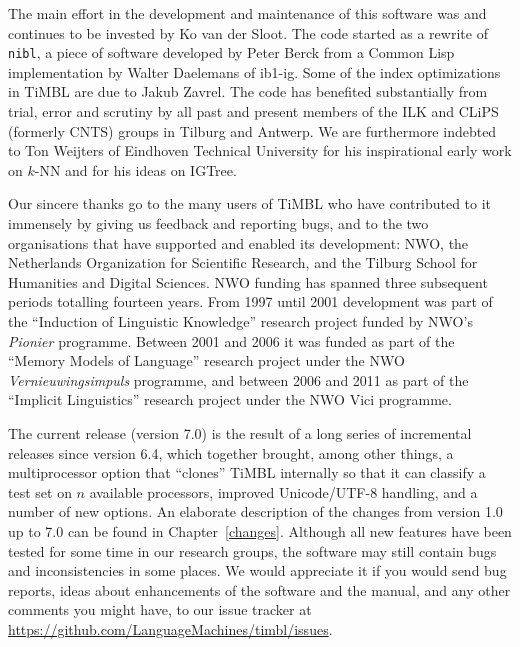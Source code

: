 \documentclass{book}
\begin{document}
The main effort in the development and maintenance of this software
was and continues to be invested by Ko van der Sloot. The code started
as a rewrite of {\tt nibl}, a piece of software developed by Peter
Berck from a Common Lisp implementation by Walter Daelemans of {\sc
  ib1-ig}. Some of the index optimizations in TiMBL are due to Jakub
Zavrel. The code has benefited substantially from trial, error and
scrutiny by all past and present members of the ILK and CLiPS
(formerly CNTS) groups in Tilburg and Antwerp. We are furthermore
indebted to Ton Weijters of Eindhoven Technical University for his
inspirational early work on $k$-NN and for his ideas on {\sc IGTree}.

Our sincere thanks go to the many users of TiMBL who have contributed
to it immensely by giving us feedback and reporting bugs, and to the
two organisations that have supported and enabled its development:
NWO, the Netherlands Organization for Scientific Research, and the
Tilburg School for Humanities and Digital Sciences. NWO funding has spanned
three subsequent periods totalling fourteen years. From 1997 until 2001
development was part of the ``Induction of Linguistic Knowledge''
research project funded by NWO's {\em Pionier}\/ programme. Between
2001 and 2006 it was funded as part of the ``Memory Models of
Language'' research project under the NWO {\em Vernieuwingsimpuls}\/
programme, and between 2006 and 2011 as part of the ``Implicit
Linguistics'' research project under the NWO Vici programme.

The current release (version 7.0) is the result of a long series of
incremental releases since version 6.4, which together brought, among
other things, a multiprocessor option that ``clones'' TiMBL internally
so that it can classify a test set on $n$ available processors,
improved Unicode/UTF-8 handling, and a number of new options. An
elaborate description of the changes from version 1.0 up to 7.0 can be
found in Chapter~\ref{changes}.  Although all new features have been
tested for
some time in our research groups, the software may still contain bugs
and inconsistencies in some places. We would appreciate it if you
would send bug reports, ideas about enhancements of the software and
the manual, and any other comments you might have, to our issue
tracker at \url{https://github.com/LanguageMachines/timbl/issues}.
\end{document}
